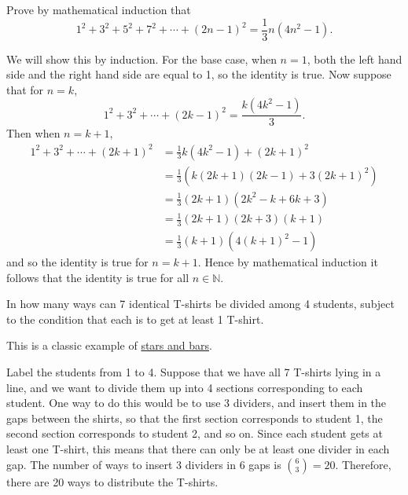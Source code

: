 \begin{question}
    Prove by mathematical induction that 
    \[1^2 + 3^2 + 5^2 + 7^2 + \cdots + (2n - 1)^2 = \frac{1}{3}n(4n^2 - 1).\] 
\end{question}
\begin{solution}
    We will show this by induction. For the base case, when $n = 1$, both the
    left hand side and the right hand side are equal to 1, so the identity is
    true. Now suppose that for $n = k$,
    \[ 1^2 + 3^2 + \cdots + (2k - 1)^2 = \frac{k(4k^2 - 1)}{3}. \]
    Then when $n = k + 1$,
    \begin{align*}
        1^2 + 3^2 + \cdots + (2k + 1)^2 &= \frac{1}{3}k(4k^2 - 1) + (2k + 1)^2\\
        &= \frac{1}{3}(k(2k + 1)(2k - 1) + 3(2k + 1)^2)\\
        &= \frac{1}{3}(2k + 1)(2k^2 - k + 6k + 3)\\
        &= \frac{1}{3}(2k + 1)(2k + 3)(k + 1)\\
        &= \frac{1}{3}(k + 1)(4(k + 1)^2 - 1)
    \end{align*}
    and so the identity is true for $n = k + 1$. Hence by mathematical
    induction it follows that the identity is true for all $n \in \mathbb{N}$.
\end{solution}

\begin{question}
    In how many ways can 7 identical T-shirts be divided among 4 students,
    subject to the condition that each is to get at least 1 T-shirt. 
\end{question}
\begin{solution}
    This is a classic example of \hyperref[teq: starsandbars]{stars and bars}. 

    Label the students from 1 to 4. Suppose that we have all 7 T-shirts lying
    in a line, and we want to divide them up into 4 sections corresponding to
    each student. One way to do this would be to use 3 dividers, and insert
    them in the gaps between the shirts, so that the first section corresponds
    to student 1, the second section corresponds to student 2, and so on. Since
    each student gets at least one T-shirt, this means that there can only be
    at least one divider in each gap. The number of ways to insert 3 dividers
    in 6 gaps is $\binom{6}{3} = 20$. Therefore, there are 20 ways to
    distribute the T-shirts.
\end{solution}

